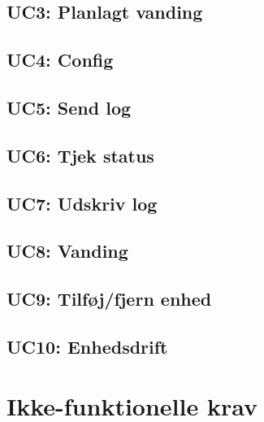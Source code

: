 
\subsection{UC3: Planlagt vanding}



\subsection{UC4: Config}



\subsection{UC5: Send log}



\subsection{UC6: Tjek status}



\subsection{UC7: Udskriv log}



\subsection{UC8: Vanding}



\subsection{UC9: Tilføj/fjern enhed}



\subsection{UC10: Enhedsdrift}



\section{Ikke-funktionelle krav}

